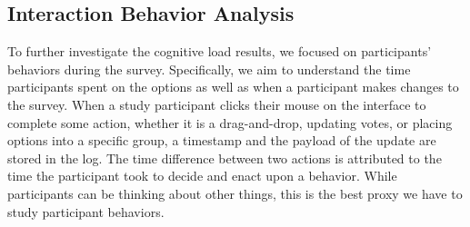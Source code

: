



\subsection{Interaction Behavior Analysis}
To further investigate the cognitive load results, we focused on participants' behaviors during the survey. Specifically, we aim to understand the time participants spent on the options as well as when a participant makes changes to the survey. When a study participant clicks their mouse on the interface to complete some action, whether it is a drag-and-drop, updating votes, or placing options into a specific group, a timestamp and the payload of the update are stored in the log. The time difference between two actions is attributed to the time the participant took to decide and enact upon a behavior. While participants can be thinking about other things, this is the best proxy we have to study participant behaviors.

